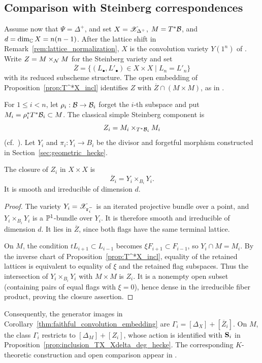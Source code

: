\subsection{Comparison with Steinberg correspondences}\label{sec:steinberg}

Assume now that $\Psi=\Delta^+$, and set $X=\mathscr X_{\Delta^+}$, $M=T^*\mathcal B$,
and $d=\dim_\mathbb C X=n(n-1)$.
After the lattice shift in Remark~\ref{rem:lattice_normalization},
$X$ is the convolution variety $Y(1^n)$ of \cite[Lemma~6.1]{cautis2018quantum}.
Write $Z=M\times_{\mathcal N}M$ for the Steinberg variety and set
\[
 \overline Z=\{(L_\bullet,L'_\bullet)\in X\times X\mid L_n=L'_n\}
\]
with its reduced subscheme structure.
The open embedding of Proposition~\ref{prop:T^*X_incl} identifies
$Z$ with $\overline Z\cap(M\times M)$, as in \cite[Lemma~11.2]{cautis2018quantum}.

For $1\leq i<n$, let $\rho_i:\mathcal B\to\mathcal B_i$ forget the $i$-th subspace and put
$M_i=\rho_i^*T^*\mathcal B_i\subset M$.
The classical simple Steinberg component is
\[
 Z_i=M_i\times_{T^*\mathcal B_i}M_i
\]
(cf.\ \cite[\S12]{ginzburg1998geometric}).
Let $Y_i$ and $\pi_i:Y_i\to B_i$ be the divisor and forgetful morphism
constructed in Section~\ref{sec:geometric_hecke}.

\begin{proposition}\label{prop:compact_steinberg_hecke}
The closure of $Z_i$ in $X\times X$ is
\begin{equation}\label{eq:compact_simple_component}
 \overline Z_i=Y_i\times_{B_i}Y_i.
\end{equation}
It is smooth and irreducible of dimension $d$.
\end{proposition}

\begin{proof}
The variety $Y_i=\mathscr X_{\mathtt r_i^-}$ is an iterated projective bundle over a point,
and $Y_i\times_{B_i}Y_i$ is a $\mathbb P^1$-bundle over $Y_i$.
It is therefore smooth and irreducible of dimension $d$.
It lies in $\overline Z$, since both flags have the same terminal lattice.

On $M$, the condition $tL_{i+1}\subset L_{i-1}$ becomes
$\xi F_{i+1}\subset F_{i-1}$, so $Y_i\cap M=M_i$.
By the inverse chart of Proposition~\ref{prop:T^*X_incl},
equality of the retained lattices is equivalent to equality of $\xi$ and the retained flag subspaces.
Thus the intersection of $Y_i\times_{B_i}Y_i$ with $M\times M$ is $Z_i$.
It is a nonempty open subset (containing pairs of equal flags with $\xi=0$),
hence dense in the irreducible fiber product, proving the closure assertion.
\end{proof}

Consequently, the generator images in Corollary~\ref{thm:faithful_convolution_embedding}
are $\Gamma_i=[\Delta_X]+[\overline Z_i]$.
On $M$, the class $\Gamma_i$ restricts to $[\Delta_M]+[Z_i]$,
whose action is identified with $\mathbf S_i$ in Proposition~\ref{prop:inclusion_TX_Xdelta_deg_hecke}.
The corresponding $K$-theoretic construction and open comparison appear in
\cite[Lemma~9.3 and Proposition~11.3]{cautis2018quantum}.
